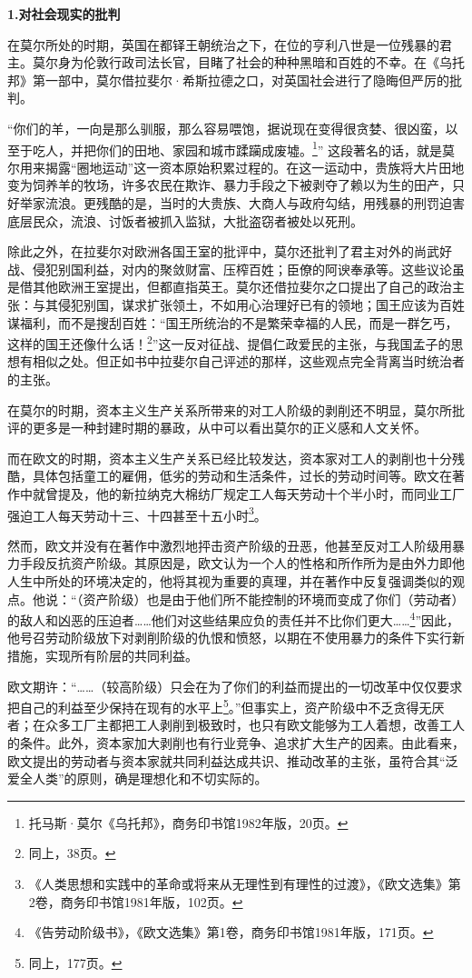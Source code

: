 \par \textbf {1.对社会现实的批判}
\par 在莫尔所处的时期，英国在都铎王朝统治之下，在位的亨利八世是一位残暴的君主。莫尔身为伦敦行政司法长官，目睹了社会的种种黑暗和百姓的不幸。在《乌托邦》第一部中，莫尔借拉斐尔·希斯拉德之口，对英国社会进行了隐晦但严厉的批判。
\par “你们的羊，一向是那么驯服，那么容易喂饱，据说现在变得很贪婪、很凶蛮，以至于吃人，并把你们的田地、家园和城市蹂躏成废墟。\footnote{托马斯·莫尔《乌托邦》，商务印书馆1982年版，20页。}” 这段著名的话，就是莫尔用来揭露“圈地运动”这一资本原始积累过程的。在这一运动中，贵族将大片田地变为饲养羊的牧场，许多农民在欺诈、暴力手段之下被剥夺了赖以为生的田产，只好举家流浪。更残酷的是，当时的大贵族、大商人与政府勾结，用残暴的刑罚迫害底层民众，流浪、讨饭者被抓入监狱，大批盗窃者被处以死刑。
\par 除此之外，在拉斐尔对欧洲各国王室的批评中，莫尔还批判了君主对外的尚武好战、侵犯别国利益，对内的聚敛财富、压榨百姓；臣僚的阿谀奉承等。这些议论虽是借其他欧洲王室提出，但都直指英王。莫尔还借拉斐尔之口提出了自己的政治主张：与其侵犯别国，谋求扩张领土，不如用心治理好已有的领地；国王应该为百姓谋福利，而不是搜刮百姓：“国王所统治的不是繁荣幸福的人民，而是一群乞丐，这样的国王还像什么话！\footnote{同上，38页。}”这一反对征战、提倡仁政爱民的主张，与我国孟子的思想有相似之处。但正如书中拉斐尔自己评述的那样，这些观点完全背离当时统治者的主张。
\par 在莫尔的时期，资本主义生产关系所带来的对工人阶级的剥削还不明显，莫尔所批评的更多是一种封建时期的暴政，从中可以看出莫尔的正义感和人文关怀。
\par 而在欧文的时期，资本主义生产关系已经比较发达，资本家对工人的剥削也十分残酷，具体包括童工的雇佣，低劣的劳动和生活条件，过长的劳动时间等。欧文在著作中就曾提及，他的新拉纳克大棉纺厂规定工人每天劳动十个半小时，而同业工厂强迫工人每天劳动十三、十四甚至十五小时\footnote{《人类思想和实践中的革命或将来从无理性到有理性的过渡》，《欧文选集》第2卷，商务印书馆1981年版，102页。}。
\par 然而，欧文并没有在著作中激烈地抨击资产阶级的丑恶，他甚至反对工人阶级用暴力手段反抗资产阶级。其原因是，欧文认为一个人的性格和所作所为是由外力即他人生中所处的环境决定的，他将其视为重要的真理，并在著作中反复强调类似的观点。他说：“（资产阶级）也是由于他们所不能控制的环境而变成了你们（劳动者）的敌人和凶恶的压迫者……他们对这些结果应负的责任并不比你们更大……\footnote{《告劳动阶级书》，《欧文选集》第1卷，商务印书馆1981年版，171页。}”因此，他号召劳动阶级放下对剥削阶级的仇恨和愤怒，以期在不使用暴力的条件下实行新措施，实现所有阶层的共同利益。
\par 欧文期许：“……（较高阶级）只会在为了你们的利益而提出的一切改革中仅仅要求把自己的利益至少保持在现有的水平上\footnote{同上，177页。}。”但事实上，资产阶级中不乏贪得无厌者；在众多工厂主都把工人剥削到极致时，也只有欧文能够为工人着想，改善工人的条件。此外，资本家加大剥削也有行业竞争、追求扩大生产的因素。由此看来，欧文提出的劳动者与资本家就共同利益达成共识、推动改革的主张，虽符合其“泛爱全人类”的原则，确是理想化和不切实际的。

